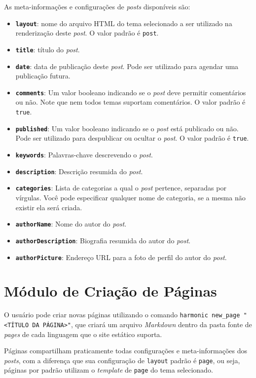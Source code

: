 \documentclass[ppginf, pep]{esinucpel}
\newcommand{\code}[1]{\texttt{#1}}
\begin{document}
As meta-informações e configurações de \textit{posts} disponíveis são:

\begin{itemize}
	\item \textbf{\code{layout}}: nome do arquivo HTML do tema selecionado a ser utilizado na renderização deste \textit{post}. O valor padrão é \code{post}.
	\item \textbf{\code{title}}: título do \textit{post}.
	\item \textbf{\code{date}}: data de publicação deste \textit{post}. Pode ser utilizado para agendar uma publicação futura.
	\item \textbf{\code{comments}}: Um valor booleano indicando se o \textit{post} deve permitir comentários ou não. Note que nem todos temas suportam comentários. O valor padrão é \code{true}.
	\item \textbf{\code{published}}: Um valor booleano indicando se o \textit{post} está publicado ou não. Pode ser utilizado para despublicar ou ocultar o \textit{post}. O valor padrão é \code{true}.
	\item \textbf{\code{keywords}}: Palavras-chave descrevendo o \textit{post}.
	\item \textbf{\code{description}}: Descrição resumida do \textit{post}.
	\item \textbf{\code{categories}}: Lista de categorias a qual o \textit{post} pertence, separadas por vírgulas. Você pode especificar qualquer nome de categoria, se a mesma não existir ela será criada.
	\item \textbf{\code{authorName}}: Nome do autor do \textit{post}.
	\item \textbf{\code{authorDescription}}: Biografia resumida do autor do \textit{post}.
	\item \textbf{\code{authorPicture}}: Endereço URL para a foto de perfil do autor do \textit{post}.
\end{itemize}

\section{Módulo de Criação de Páginas}

O usuário pode criar novas páginas utilizando o comando \code{harmonic new\_page "\textless TÍTULO DA PÁGINA\textgreater"}, que criará um arquivo \emph{Markdown} dentro da pasta fonte de \textit{pages} de cada linguagem que o site estático suporta.

Páginas compartilham praticamente todas configurações e meta-informações dos \textit{posts}, com a diferença que sua configuração de \code{layout} padrão é \code{page}, ou seja, páginas por padrão utilizam o \textit{template} de \code{page} do tema selecionado.
\end{document}
